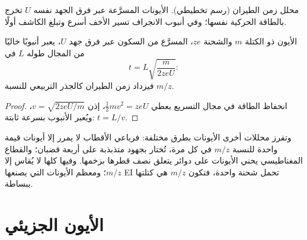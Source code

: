 \begin{omfigure}
\par\vspace{4pt}

{\small محلل زمن الطيران (رسم تخطيطي). الأيونات المسرَّعة عبر فرق الجهد نفسه
$U$ تخرج بالطاقة الحركية نفسها؛ وفي أنبوب الانجراف تسير الأخف أسرع وتبلغ
الكاشف أولًا.}
\end{omfigure}

\begin{proposition}\label{prop:b2:mass-spec-atomic:time-of-flight}
الأيون ذو الكتلة $m$ والشحنة $ze$، المسرَّع من السكون عبر فرق جهد $U$، يعبر
أنبوبًا خاليًا من المجال طوله $L$ في
\begin{equation*}
t = L\sqrt{\frac{m}{2zeU}}:
\end{equation*}
فيزداد زمن الطيران كالجذر التربيعي للنسبة $m/z$.
\end{proposition}

\begin{proof}
انحفاظ الطاقة في مجال التسريع يعطي $\tfrac12mv^2 = zeU$، إذن $v = \sqrt{2zeU/m}$، 
ويُعبر الأنبوب بسرعة ثابتة: $t = L/v$.
\end{proof}

وتفرز محللات أخرى الأيونات بطرق مختلفة: فرباعي الأقطاب لا يمرر إلا أيونات قيمة واحدة للنسبة $m/z$ في كل مرة،
تُختار بجهود متذبذبة على أربعة قضبان؛ والقطاع المغناطيسي يحني الأيونات على دوائر يتعلق نصف قطرها
بزخمها. وفيها كلها لا يُقاس إلا $m/z$؛ ومعظم الأيونات التي يصنعها EI تحمل شحنة
واحدة، فتكون $m/z$ هي كتلتها ببساطة.

\section{الأيون الجزيئي}

